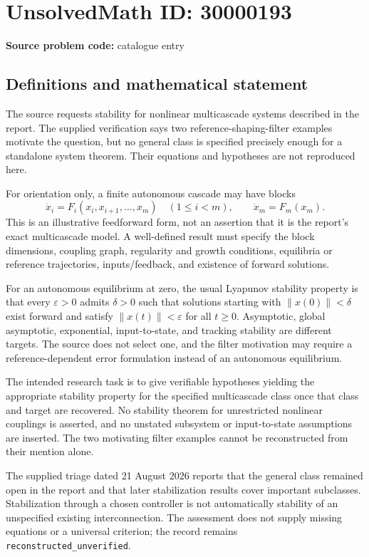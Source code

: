 \documentclass[11pt]{article}
\begin{document}
\section*{UnsolvedMath ID: 30000193}
\textbf{Source problem code:} catalogue entry
\subsection{Definitions and mathematical statement}
The source requests stability for nonlinear multicascade systems described in the report. The supplied verification says two reference-shaping-filter examples motivate the question, but no general class is specified precisely enough for a standalone system theorem. Their equations and hypotheses are not reproduced here.

For orientation only, a finite autonomous cascade may have blocks
\[
 \dot x_i=F_i(x_i,x_{i+1},\ldots,x_m)\quad(1\leq i<m),
 \qquad\dot x_m=F_m(x_m).
\]
This is an illustrative feedforward form, not an assertion that it is the report's exact multicascade model. A well-defined result must specify the block dimensions, coupling graph, regularity and growth conditions, equilibria or reference trajectories, inputs/feedback, and existence of forward solutions.

For an autonomous equilibrium at zero, the usual Lyapunov stability property is that every \(\varepsilon>0\) admits \(\delta>0\) such that solutions starting with \(\|x(0)\|<\delta\) exist forward and satisfy \(\|x(t)\|<\varepsilon\) for all \(t\geq0\). Asymptotic, global asymptotic, exponential, input-to-state, and tracking stability are different targets. The source does not select one, and the filter motivation may require a reference-dependent error formulation instead of an autonomous equilibrium.

The intended research task is to give verifiable hypotheses yielding the appropriate stability property for the specified multicascade class once that class and target are recovered. No stability theorem for unrestricted nonlinear couplings is asserted, and no unstated subsystem or input-to-state assumptions are inserted. The two motivating filter examples cannot be reconstructed from their mention alone.

The supplied triage dated 21 August 2026 reports that the general class remained open in the report and that later stabilization results cover important subclasses. Stabilization through a chosen controller is not automatically stability of an unspecified existing interconnection. The assessment does not supply missing equations or a universal criterion; the record remains \texttt{reconstructed\_unverified}.
\end{document}
